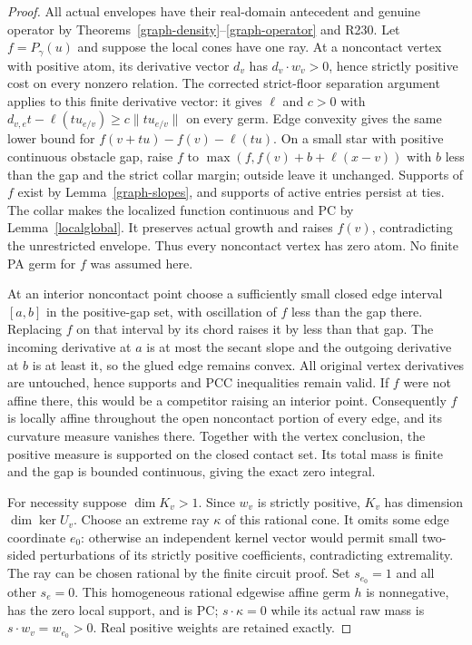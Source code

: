 \documentclass[11pt]{article}
\begin{document}
\begin{proof}
All actual envelopes have their real-domain antecedent and genuine
operator by Theorems~\ref{graph-density}--\ref{graph-operator} and R230.
Let $f=P_\gamma(u)$ and suppose the local cones have one ray.
At a noncontact vertex with positive atom, its derivative vector $d_v$
has $d_v\cdot w_v>0$, hence strictly positive cost on every nonzero
relation. The corrected strict-floor separation argument applies to
this finite derivative vector: it gives $\ell$ and $c>0$ with
$d_{v,e}t-\ell(tu_{e/v})\geq c\|tu_{e/v}\|$ on every germ.
Edge convexity gives the same lower bound for
$f(v+tu)-f(v)-\ell(tu)$. On a small star with positive continuous
obstacle gap, raise $f$ to
$\max(f,f(v)+b+\ell(x-v))$ with $b$ less than the gap and the strict
collar margin; outside leave it unchanged. Supports of $f$ exist by
Lemma~\ref{graph-slopes}, and supports of active entries persist at
ties. The collar makes the localized function continuous and PC by
Lemma~\ref{localglobal}. It preserves actual growth and raises $f(v)$,
contradicting the unrestricted envelope. Thus every noncontact vertex
has zero atom. No finite PA germ for $f$ was assumed here.

At an interior noncontact point choose a sufficiently small closed
edge interval $[a,b]$ in the positive-gap set, with oscillation of $f$
less than the gap there. Replacing $f$ on that interval by its chord
raises it by less than that gap. The incoming derivative at $a$ is
at most the secant slope and the outgoing derivative at $b$ is at
least it, so the glued edge remains convex. All original vertex
derivatives are untouched, hence supports and PCC inequalities remain
valid. If $f$ were not affine there, this would be a competitor raising
an interior point. Consequently $f$ is locally affine throughout the
open noncontact portion of every edge, and its curvature measure
vanishes there. Together with the vertex conclusion, the positive
measure is supported on the closed contact set. Its total mass is
finite and the gap is bounded continuous, giving the exact zero integral.

For necessity suppose $\dim K_v>1$. Since $w_v$ is strictly positive,
$K_v$ has dimension $\dim\ker U_v$. Choose an extreme ray $\kappa$
of this rational cone. It omits some edge coordinate $e_0$:
otherwise an independent kernel vector would permit small two-sided
perturbations of its strictly positive coefficients, contradicting
extremality. The ray can be chosen rational by the finite circuit proof.
Set $s_{e_0}=1$ and all other $s_e=0$. This homogeneous rational
edgewise affine germ $h$ is nonnegative, has the zero local support,
and is PC; $s\cdot\kappa=0$ while its actual raw mass is
$s\cdot w_v=w_{e_0}>0$. Real positive weights are retained exactly.


\end{proof}
\end{document}
